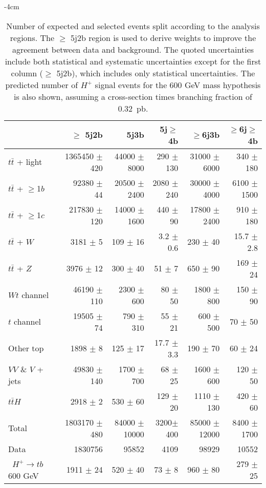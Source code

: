 \begin{table}[htb]
    \small
    \addtolength{\leftskip} {-4cm} %
    \addtolength{\rightskip}{-4cm}
    \centering
    \begin{tabular}{l r r r r r}
        \toprule\toprule
          & $\geq$ 5j2b & {5j3b} & {5j$\geq$4b} & {$\geq$6j3b} & {$\geq$6j$\geq$4b}\\
          \midrule 
  $t\bar{t}$ + light        & 1365450 $\pm$ 420 & 44000 $\pm$ 8000  & 290 $\pm$ 130  & 31000 $\pm$ 6000  & 340 $\pm$ 180 \\ 
  $t\bar{t}$ + $\geq$1$b$   & 92380   $\pm$ 44 & 20500  $\pm$ 2400  & 2080 $\pm$ 240 & 30000 $\pm$ 4000  & 6100 $\pm$ 1500   \\ 
  $t\bar{t}$ + $\geq$1$c$   & 217830  $\pm$ 120 & 14000 $\pm$ 1600  & 440 $\pm$ 90   & 17800 $\pm$ 2400  & 910  $\pm$ 180   \\ 
  $t\bar{t}$ + $W$          & 3181    $\pm$ 5   & 109   $\pm$ 16    & 3.2 $\pm$ 0.6  & 230   $\pm$ 40    & 15.7   $\pm$ 2.8 \\ 
  $t\bar{t}$ + $Z$          & 3976    $\pm$ 12  & 300   $\pm$ 40    & 51  $\pm$ 7    & 650   $\pm$ 90    & 169  $\pm$ 24 \\ 
  $Wt$ channel              & 46190   $\pm$ 110 & 2300  $\pm$ 600   & 80  $\pm$ 50   & 1800  $\pm$ 800   & 150  $\pm$ 90 \\ 
  $t$ channel               & 19505   $\pm$ 74  & 790   $\pm$ 310   & 55  $\pm$ 21   & 600   $\pm$ 500   & 70   $\pm$ 50 \\ 
  Other top         & 1898    $\pm$ 8   & 125   $\pm$ 17    & 17.7  $\pm$ 3.3    & 190   $\pm$ 70    & 60   $\pm$ 24 \\ 
  $VV$ \& $V$ + jets        & 49830   $\pm$ 140 & 1700  $\pm$ 700   & 68  $\pm$ 25   & 1600  $\pm$ 600   & 120  $\pm$ 50 \\ 
  $t\bar{t}H$               & 2918    $\pm$ 2   & 530   $\pm$ 60    & 129 $\pm$ 20   & 1110  $\pm$ 130   & 420  $\pm$ 60 \\ 
\midrule      
  Total                     &1803170 $\pm$ 480 & 84000 $\pm$ 10000 & 3200$\pm$ 400 & 85000 $\pm$ 12000 & 8400 $\pm$ 1700 \\
\midrule
  Data                      &1830756           & 95852             & 4109          & 98929          & 10552 \\
\midrule  
\midrule\ $H^+\to tb$ 600 GeV             & 1911 $\pm$ 24   & 520 $\pm$ 40      & 73 $\pm$ 8    & 960 $\pm$ 80   & 279 $\pm$ 25  \\   
\bottomrule\bottomrule                               
    \end{tabular}
    \caption{Number of expected and selected events split according to the analysis regions. The $\geq$ 5j2b region is used to derive weights to improve the agreement between data and background. The quoted uncertainties include both statistical and systematic uncertainties except for the first column ($\geq$ 5j2b), which includes only statistical uncertainties. The predicted number of $H^+$ signal events for the 600 GeV mass hypothesis is also shown, assuming a cross-section times branching fraction of 0.32~pb.}
    \label{Hplustb:prefityields}
\end{table}

